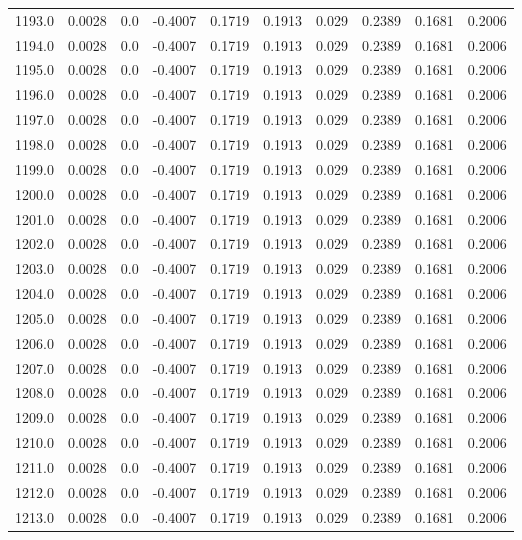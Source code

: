 \begin{longtable}{lrrrrrrrrr}
1193.0 & 0.0028 & 0.0 & -0.4007 & 0.1719 & 0.1913 & 0.029 & 0.2389 & 0.1681 & 0.2006 \\
1194.0 & 0.0028 & 0.0 & -0.4007 & 0.1719 & 0.1913 & 0.029 & 0.2389 & 0.1681 & 0.2006 \\
1195.0 & 0.0028 & 0.0 & -0.4007 & 0.1719 & 0.1913 & 0.029 & 0.2389 & 0.1681 & 0.2006 \\
1196.0 & 0.0028 & 0.0 & -0.4007 & 0.1719 & 0.1913 & 0.029 & 0.2389 & 0.1681 & 0.2006 \\
1197.0 & 0.0028 & 0.0 & -0.4007 & 0.1719 & 0.1913 & 0.029 & 0.2389 & 0.1681 & 0.2006 \\
1198.0 & 0.0028 & 0.0 & -0.4007 & 0.1719 & 0.1913 & 0.029 & 0.2389 & 0.1681 & 0.2006 \\
1199.0 & 0.0028 & 0.0 & -0.4007 & 0.1719 & 0.1913 & 0.029 & 0.2389 & 0.1681 & 0.2006 \\
1200.0 & 0.0028 & 0.0 & -0.4007 & 0.1719 & 0.1913 & 0.029 & 0.2389 & 0.1681 & 0.2006 \\
1201.0 & 0.0028 & 0.0 & -0.4007 & 0.1719 & 0.1913 & 0.029 & 0.2389 & 0.1681 & 0.2006 \\
1202.0 & 0.0028 & 0.0 & -0.4007 & 0.1719 & 0.1913 & 0.029 & 0.2389 & 0.1681 & 0.2006 \\
1203.0 & 0.0028 & 0.0 & -0.4007 & 0.1719 & 0.1913 & 0.029 & 0.2389 & 0.1681 & 0.2006 \\
1204.0 & 0.0028 & 0.0 & -0.4007 & 0.1719 & 0.1913 & 0.029 & 0.2389 & 0.1681 & 0.2006 \\
1205.0 & 0.0028 & 0.0 & -0.4007 & 0.1719 & 0.1913 & 0.029 & 0.2389 & 0.1681 & 0.2006 \\
1206.0 & 0.0028 & 0.0 & -0.4007 & 0.1719 & 0.1913 & 0.029 & 0.2389 & 0.1681 & 0.2006 \\
1207.0 & 0.0028 & 0.0 & -0.4007 & 0.1719 & 0.1913 & 0.029 & 0.2389 & 0.1681 & 0.2006 \\
1208.0 & 0.0028 & 0.0 & -0.4007 & 0.1719 & 0.1913 & 0.029 & 0.2389 & 0.1681 & 0.2006 \\
1209.0 & 0.0028 & 0.0 & -0.4007 & 0.1719 & 0.1913 & 0.029 & 0.2389 & 0.1681 & 0.2006 \\
1210.0 & 0.0028 & 0.0 & -0.4007 & 0.1719 & 0.1913 & 0.029 & 0.2389 & 0.1681 & 0.2006 \\
1211.0 & 0.0028 & 0.0 & -0.4007 & 0.1719 & 0.1913 & 0.029 & 0.2389 & 0.1681 & 0.2006 \\
1212.0 & 0.0028 & 0.0 & -0.4007 & 0.1719 & 0.1913 & 0.029 & 0.2389 & 0.1681 & 0.2006 \\
1213.0 & 0.0028 & 0.0 & -0.4007 & 0.1719 & 0.1913 & 0.029 & 0.2389 & 0.1681 & 0.2006 \\

\end{longtable}
